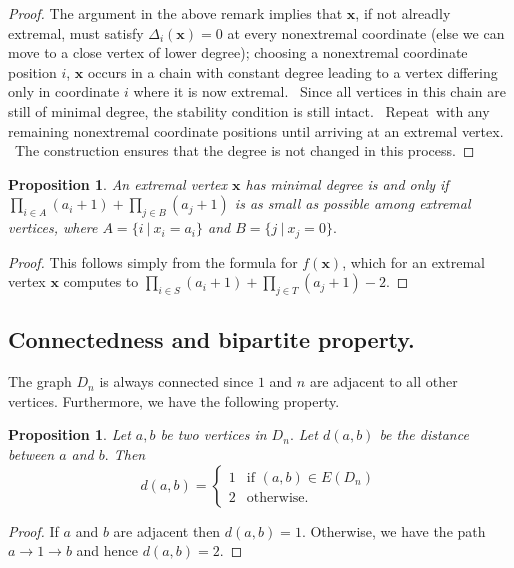 \documentclass[11pt,a4paper]{amsart}
\newtheorem{prop}[thm]{Proposition}
\theoremstyle{definition}
\numberwithin{equation}{section}
\begin{document}
\begin{proof}
The argument
in the above remark implies that $\mathbf{x}$, if not alreadly
extremal, must satisfy $\Delta _{i}(\mathbf{x})=0$ at every
nonextremal coordinate (else we can move to a close vertex of lower degree); choosing a nonextremal coordinate position $i$, $\mathbf{x}$ occurs in
a chain with constant degree leading to a vertex differing
only in coordinate $i$ where it is now extremal. \ Since all vertices in this chain are still of minimal degree, the stability condition is still intact. \
Repeat\ with any remaining nonextremal coordinate positions until arriving
at an extremal vertex. \ The construction ensures that the degree is not
changed in this process.
\end{proof}


\begin{prop}
An extremal vertex $\mathbf{x}$ has minimal degree is and only if $%
\prod\limits_{i\in A}(a_{i}+1)+\prod\limits_{j\in B}(a_{j}+1)$ is as small
as possible among extremal vertices, where $A=\{i~|~x_{i}=a_{i}\}$ and $%
B=\{j~|~x_{j}=0\}.$
\end{prop}

\begin{proof}
This follows simply from the formula for $f(\mathbf{x})$, which for
an extremal vertex $\mathbf{x}$ computes to $\prod\limits_{i\in
S}(a_{i}+1)+\prod\limits_{j\in T}(a_{j}+1)-2$.
\end{proof}

\subsection{Connectedness and bipartite property.}
The graph $D_n$ is always connected since $1$ and $n$ are adjacent to all other vertices. Furthermore, we have the following property. 
\begin{prop}
    Let $a,b$ be two vertices in $D_n.$ Let $d(a,b)$ be the distance between $a$ and $b.$ Then 
    \[
d(a,b) = 
\begin{cases} 
1 & \text{if } (a,b) \in E(D_n) \\
2 & \text{otherwise.} 
\end{cases}
\]
\end{prop}

\begin{proof}
    If $a$ and $b$ are adjacent then $d(a,b)=1.$ Otherwise, we have the path $a \to 1 \to b$ and hence $d(a,b)=2.$
\end{proof}
\end{document}
